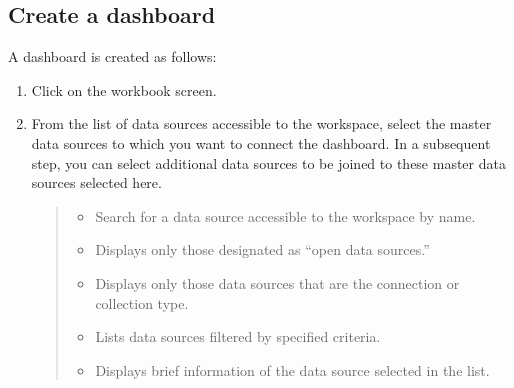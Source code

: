 \documentclass[letterpaper,10pt,english]{sphinxmanual}
\begin{document}
\subsection{Create a dashboard}
\label{\detokenize{discovery/part04/create_a_dashboard:id1}}\label{\detokenize{discovery/part04/create_a_dashboard::doc}}
A dashboard is created as follows:
\begin{enumerate}
\def\theenumi{\arabic{enumi}}
\def\labelenumi{\theenumi .}
\makeatletter\def\p@enumii{\p@enumi \theenumi .}\makeatother
\item {} 
Click  on the workbook screen.
\begin{quote}

\begin{figure}[H]
\centering

\noindent{}
\end{figure}
\end{quote}

\item {} 
From the list of data sources accessible to the workspace, select the master data sources to which you want to connect the dashboard. In a subsequent step, you can select additional data sources to be joined to these master data sources selected here.
\begin{quote}

\begin{figure}[H]
\centering

\noindent{}
\end{figure}
\begin{itemize}
\item {} 
 Search for a data source accessible to the workspace by name.

\item {} 
 Displays only those designated as “open data sources.”

\item {} 
 Displays only those data sources that are the connection or collection type.

\item {} 
 Lists data sources filtered by specified criteria.

\item {} 
 Displays brief information of the data source selected in the list.


\end{itemize}
\end{quote}
\end{enumerate}
\end{document}
